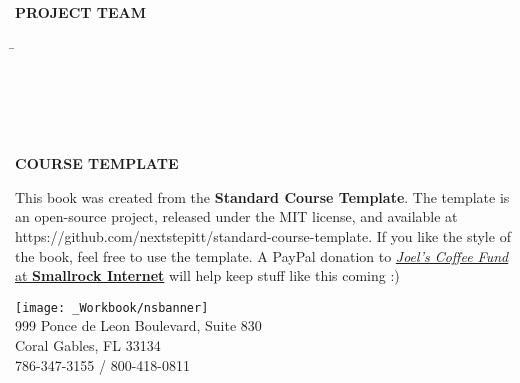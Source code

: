 \documentclass[../workbook]{subfiles}
\begin{document}
{    \begin{tabbing}
        \textbf{PROJECT TEAM}\\
        \\
         \hspace{1cm} \=  \\ %
         \>  \\
         \>  \\
         \>  \\
         \>  \\
    \end{tabbing}

    \textbf{COURSE TEMPLATE}

    \par{
        This book was created from the \textbf{Standard Course Template}.
        The template is an open-source project, released under the MIT license, and available at https://github.com/nextstepitt/standard-course-template. 
        If you like the style of the book, feel free to use the template.
        A PayPal donation to \href{https://www.paypal.com/cgi-bin/webscr?cmd=_s-xclick&hosted_button_id=XPUGVGZZ8RUAA}{\textit{Joel's Coffee Fund} at \textbf{Smallrock Internet}} will help keep stuff like this coming :)
    }
}

\parbox{\textwidth}{
    
    \vspace{2em}
    \small
    \raggedright

    \texttt{[image: \_Workbook/nsbanner]}\\
    999 Ponce de Leon Boulevard, Suite 830\\
    Coral Gables, FL 33134\\
    786-347-3155 / 800-418-0811\\
}
\end{document}
